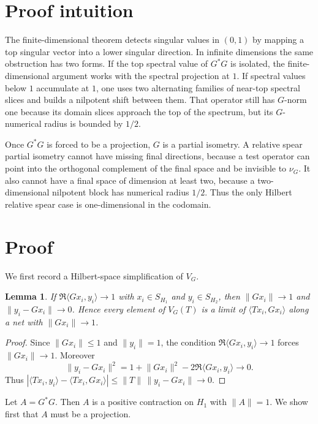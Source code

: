\documentclass[11pt]{article}
\newtheorem{lemma}{Lemma}
\newcommand{\norm}[1]{\lVert #1\rVert}
\begin{document}
\section*{Proof intuition}

The finite-dimensional theorem detects singular values in $(0,1)$ by mapping a
top singular vector into a lower singular direction.  In infinite dimensions the
same obstruction has two forms.  If the top spectral value of $G^*G$ is
isolated, the finite-dimensional argument works with the spectral projection at
$1$.  If spectral values below $1$ accumulate at $1$, one uses two alternating
families of near-top spectral slices and builds a nilpotent shift between them.
That operator still has $G$-norm one because its domain slices approach the top
of the spectrum, but its $G$-numerical radius is bounded by $1/2$.

Once $G^*G$ is forced to be a projection, $G$ is a partial isometry.  A
relative spear partial isometry cannot have missing final directions, because a
test operator can point into the orthogonal complement of the final space and
be invisible to $\nu_G$.  It also cannot have a final space of dimension at
least two, because a two-dimensional nilpotent block has numerical radius
$1/2$.  Thus the only Hilbert relative spear case is one-dimensional in the
codomain.

\section*{Proof}

We first record a Hilbert-space simplification of $V_G$.

\begin{lemma}\label{lem:hilbert-vg}
If $\Re\langle Gx_i,y_i\rangle\to 1$ with
$x_i\in S_{H_1}$ and $y_i\in S_{H_2}$, then
$\norm{Gx_i}\to 1$ and $\norm{y_i-Gx_i}\to0$.  Hence every element of
$V_G(T)$ is a limit of $\langle T x_i,Gx_i\rangle$ along a net with
$\norm{Gx_i}\to1$.
\end{lemma}

\begin{proof}
Since $\norm{Gx_i}\le1$ and $\norm{y_i}=1$, the condition
$\Re\langle Gx_i,y_i\rangle\to1$ forces $\norm{Gx_i}\to1$.  Moreover
\[
  \norm{y_i-Gx_i}^2
  =1+\norm{Gx_i}^2-2\Re\langle Gx_i,y_i\rangle \to0.
\]
Thus
$|\langle T x_i,y_i\rangle-\langle T x_i,Gx_i\rangle|
\le \norm{T}\,\norm{y_i-Gx_i}\to0$.
\end{proof}

Let $A=G^*G$.  Then $A$ is a positive contraction on $H_1$ with $\norm{A}=1$.
We show first that $A$ must be a projection.
\end{document}
